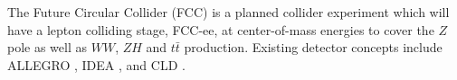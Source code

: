 


The Future Circular Collider (FCC) \cite{FCCeeconcept,fccatcern} is a planned collider experiment which will have a lepton colliding stage, FCC-ee, at center-of-mass energies to cover the $Z$ pole as well as $WW$, $ZH$ and $t\bar{t}$ production.
Existing detector concepts include ALLEGRO \cite{allegroconcept}, IDEA \cite{ideaconcept,idea2}, and CLD \cite{cldconcept}.